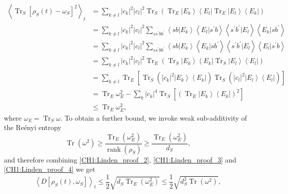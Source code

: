 \begin{equation}
\begin{aligned}
\left\langle\operatorname{Tr}_{S}\left[\rho_{S}(t)-\omega_{S}\right]^{2}\right\rangle_{t} &=\sum_{k \neq l}\left|c_{k}\right|^{2}\left|c_{l}\right|^{2} \operatorname{Tr}_{S}\left(\operatorname{Tr}_{E}\left|E_{k}\right\rangle\left\langle E_{l}\left|\operatorname{Tr}_{E}\right| E_{l}\right\rangle\left\langle E_{k}\right|\right) \\
&=\sum_{k \neq l}\left|c_{k}\right|^{2}\left|c_{l}\right|^{2} \sum_{s s^{\prime} b b^{\prime}}\left\langle s b | E_{k}\right\rangle\left\langle E_{l} | s^{\prime} b\right\rangle\left\langle s^{\prime} b^{\prime} | E_{l}\right\rangle\left\langle E_{k} | s b^{\prime}\right\rangle\\
&=\sum_{k \neq l}\left|c_{k}\right|^{2}\left|c_{l}\right|^{2} \sum_{s s^{\prime} b b^{\prime}}\left\langle s b | E_{k}\right\rangle\left\langle E_{k} | s b^{\prime}\right\rangle\left\langle s^{\prime} b^{\prime} | E_{l}\right\rangle\left\langle E_{l} | s^{\prime} b\right\rangle \\
&=\sum_{k \neq l}\left|c_{k}\right|^{2}\left|c_{l}\right|^{2} \operatorname{Tr}_{E}\left(\operatorname{Tr}_{S}\left|E_{k}\right\rangle\left\langle E_{k}\left|\operatorname{Tr}_{S}\right| E_{l}\right\rangle\left\langle E_{l}\right|\right)\\
&=\sum_{k \neq l} \operatorname{Tr}_{E}\left[\operatorname{Tr}_{S}\left(\left|c_{k}\right|^{2}\left|E_{k}\right\rangle\left\langle E_{k}\right|\right) \operatorname{Tr}_{S}\left(\left|c_{l}\right|^{2}\left|E_{l}\right\rangle\left\langle E_{l}\right|\right)\right] \\
&=\operatorname{Tr}_{E} \omega_{E}^{2}-\sum_{k}\left|c_{k}\right|^{4} \operatorname{Tr}_{S}\left[\left(\operatorname{Tr}_{E}\left|E_{k}\right\rangle\left\langle E_{k}\right|\right)^{2}\right] \\
&\leq \operatorname{Tr}_{E} \omega_{E}^{2},
\end{aligned}
\label{CH1:Linden_proof_3}
\end{equation}
where $\omega_E=\operatorname{Tr}_S \omega$. To obtain a further bound, we invoke weak sub-additivity of the Re\'enyi entropy \cite{camilo_strong_2019}
\begin{equation}
\operatorname{Tr}\left(\omega^{2}\right) \geq \frac{\operatorname{Tr}_{E}\left(\omega_{E}^{2}\right)}{\operatorname{rank}\left(\rho_{S}\right)} \geq \frac{\operatorname{Tr}_{E}\left(\omega_{E}^{2}\right)}{d_{S}},
\label{CH1:Linden_proof_4}
\end{equation}
and therefore combining \eqref{CH1:Linden_proof_2}, \eqref{CH1:Linden_proof_3} and \eqref{CH1:Linden_proof_4} we get
\begin{equation}
\left\langle D\left[\rho_{S}(t), \omega_{S}\right]\right\rangle_{t} \leq \frac{1}{2} \sqrt{d_{S} \operatorname{Tr}_{E}\left(\omega_{E}^{2}\right)} \leq \frac{1}{2} \sqrt{d_{S}^{2} \operatorname{Tr}\left(\omega^{2}\right)},
\label{CH1:Inequality_last}
\end{equation}

